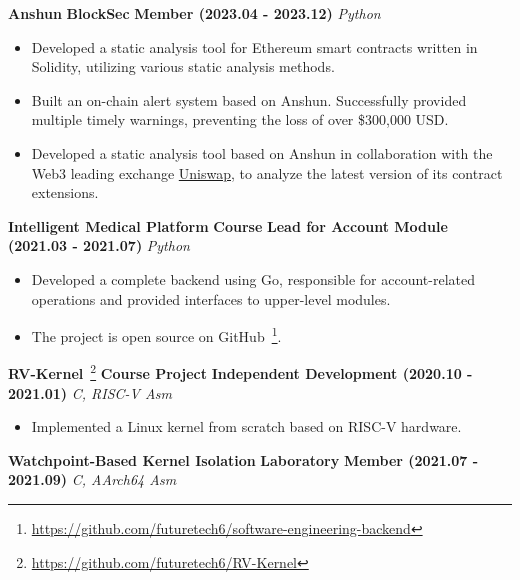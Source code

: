     \noindent \textbf{Anshun} \textbar{} \textbf{BlockSec} \textbar{} \textbf{Member (2023.04 - 2023.12)} \hfill
    \textsl{Python}

    \begin{itemize}
        \item Developed a static analysis tool for Ethereum smart contracts written in Solidity, utilizing various
              static analysis methods.
        \item Built an on-chain alert system based on Anshun. Successfully provided multiple timely warnings,
              preventing the loss of over \$300,000 USD.
        \item Developed a static analysis tool based on Anshun in collaboration with the Web3 leading exchange
              \href{https://defillama.com/protocols/Dexes}{Uniswap}, to analyze the latest version of its contract
              extensions.
    \end{itemize}

    \ifdefined\qr

        \noindent \textbf{Intelligent Medical Platform} \textbar{} \textbf{Course} \textbar{} \textbf{Lead for Account
        Module (2021.03 - 2021.07)} \hfill \textsl{Python}

        \begin{itemize}
            \item Developed a complete backend using Go, responsible for account-related operations and provided
                  interfaces to upper-level modules.
            \item The project is open source on
                  GitHub~\footnote{\url{https://github.com/futuretech6/software-engineering-backend}}.
        \end{itemize}

    \fi

    \noindent \textbf{RV-Kernel}~\footnote{\url{https://github.com/futuretech6/RV-Kernel}} \textbar{} \textbf{Course
    Project} \textbar{} \textbf{Independent Development (2020.10 - 2021.01)} \hfill \textsl{C, RISC-V Asm}

    \begin{itemize}
        \item Implemented a Linux kernel from scratch based on RISC-V hardware.
    \end{itemize}

    \noindent \textbf{Watchpoint-Based Kernel Isolation} \textbar{} \textbf{Laboratory} \textbar{} \textbf{Member
    (2021.07 - 2021.09)} \hfill \textsl{C, AArch64 Asm}


